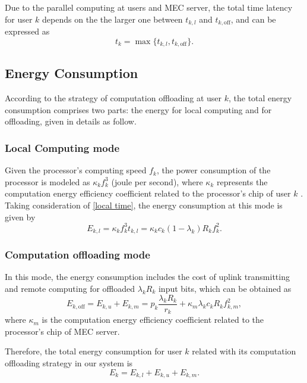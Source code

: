\documentclass[journal]{IEEEtran}
\begin{document}
Due to the parallel computing at users and MEC server, the total time latency for user $k$ depends on the the larger one between $t_{k,l}$ and $t_{k,\text{off}}$, and can be expressed as
\begin{equation}
t_k = \max \{t_{k,l}, t_{k,\text{off}}\}.
\end{equation}
\subsection{Energy Consumption}
According to the strategy of computation offloading at user $k$, the total energy consumption comprises two parts: the energy for local computing and for offloading, given in details as follow. 
\subsubsection{Local Computing mode}
Given the processor's computing speed $f_k$, the power consumption of the processor is modeled as $\kappa_kf_k^3$ (joule per second), where $\kappa_k$ represents the computation energy efficiency coefficient related to the processor's chip of user $k$ \cite{Zhang2013Energy,Wang2016Mobile,Bi2018Computation}. Taking consideration of \eqref{local time}, the energy consumption at this mode is given by
\begin{equation}
E_{k,l}=\kappa_kf_k^3t_{k,l}=\kappa_kc_k\left(1-\lambda_k\right) R_kf_k^2. 
\end{equation}
\subsubsection{Computation offloading mode}
In this mode, the energy consumption includes the cost of uplink transmitting and remote computing for offloaded $\lambda_kR_k$ input bits, which can be obtained as
\begin{equation}\label{e_u,m}
 E_{k,\text{off}}=E_{k,u}+E_{k,m}= p_{k}\frac{\lambda_kR_k}{r_k}+\kappa_m\lambda_kc_kR_kf_{k,m}^2,
\end{equation}
where $\kappa_m$ is the computation energy efficiency coefficient related to the processor's chip of MEC server.

Therefore, the total energy consumption for user $k$ related with its computation offloading strategy in our system is
\begin{equation}
 E_k = E_{k,l}+E_{k,u}+E_{k,m}.
\end{equation}
\end{document}
